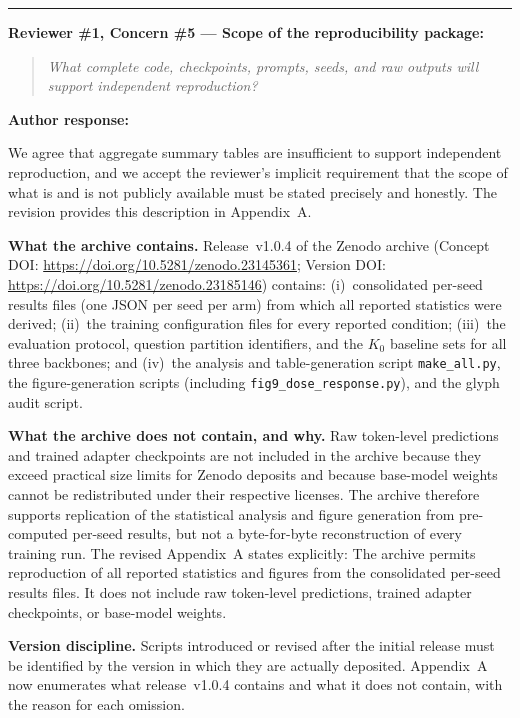 \documentclass[11pt,a4paper]{article}
\newcommand{\newtext}[1]{#1}
\newcommand{\rconcern}[3]{%
  \bigskip\noindent\rule{\linewidth}{0.4pt}\par\medskip
  \noindent\textbf{\textcolor{rccolor}{#1 --- #2:}}\par
  \smallskip
  \begin{quote}\itshape\textcolor{rccolor}{#3}\end{quote}%
}
\newcommand{\arhead}[1]{\medskip\noindent\textbf{#1}\par\smallskip}
\newcommand{\newtext}[1]{\textcolor{chgcolor}{``#1''}}
\begin{document}
\rconcern{Reviewer \#1, Concern \#5}{Scope of the reproducibility package}{What complete code, checkpoints, prompts, seeds, and raw outputs will support independent reproduction?}

\arhead{Author response:}

We agree that aggregate summary tables are insufficient to support
independent reproduction, and we accept the reviewer's implicit
requirement that the scope of what is and is not publicly available must
be stated precisely and honestly. The revision provides this description
in Appendix~A.

\textbf{What the archive contains.}
Release~v1.0.4 of the Zenodo archive (Concept DOI:
\url{https://doi.org/10.5281/zenodo.23145361};
Version DOI: \url{https://doi.org/10.5281/zenodo.23185146})
contains: (i)~consolidated per-seed results files (one JSON per seed per
arm) from which all reported statistics were derived;
(ii)~the training configuration files for every reported condition;
(iii)~the evaluation protocol, question partition identifiers, and the
$K_0$ baseline sets for all three backbones; and
(iv)~the analysis and table-generation script \texttt{make\_all.py},
the figure-generation scripts (including \texttt{fig9\_dose\_response.py}),
and the glyph audit script.

\textbf{What the archive does not contain, and why.}
Raw token-level predictions and trained adapter checkpoints are not
included in the archive because they exceed practical size limits for
Zenodo deposits and because base-model weights cannot be redistributed
under their respective licenses. The archive therefore supports
replication of the statistical analysis and figure generation from
pre-computed per-seed results, but not a byte-for-byte reconstruction
of every training run. The revised Appendix~A states explicitly:
\newtext{The archive permits reproduction of all reported statistics
and figures from the consolidated per-seed results files. It does not
include raw token-level predictions, trained adapter checkpoints, or base-model
weights.}

\textbf{Version discipline.}
Scripts introduced or revised after the initial release must be
identified by the version in which they are actually deposited.
Appendix~A now enumerates what release~v1.0.4 contains and what it does
not contain, with the reason for each omission.
\end{document}
